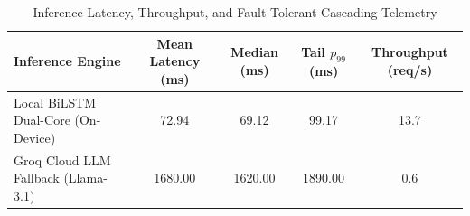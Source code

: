 \begin{table}[htbp]
\centering
\caption{Inference Latency, Throughput, and Fault-Tolerant Cascading Telemetry}
\label{tab:latency_benchmarks}
\begin{tabular}{lcccc}
\hline
\textbf{Inference Engine} & \textbf{Mean Latency (ms)} & \textbf{Median (ms)} & \textbf{Tail $p_{99}$ (ms)} & \textbf{Throughput (req/s)} \\
\hline
Local BiLSTM Dual-Core (On-Device) & 72.94 & 69.12 & 99.17 & 13.7 \\
Groq Cloud LLM Fallback (Llama-3.1)  & 1680.00 & 1620.00 & 1890.00 & 0.6 \\
\hline
\end{tabular}
\end{table}
